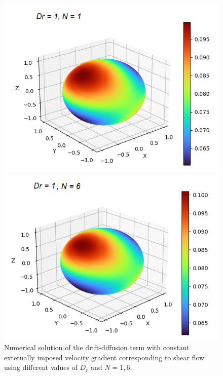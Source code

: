 \begin{frame}
\begin{figure}[H]
\begin{minipage}{0.4\textwidth}
			\includegraphics[scale=0.4]{Bilder_wx/wx=1_Dr=1_N=1}
		\end{minipage}
		\hfill 
		\begin{minipage}{0.4\textwidth}
			\includegraphics[scale=0.4]{Bilder_wx/wx=1_Dr=1_N=6}
		\end{minipage}
		\caption{ Numerical solution of the drift-diffusion term with constant externally imposed velocity gradient corresponding to shear flow using different values of $D_r$ and $N = 1,6$.}
	\end{figure}
\end{frame}
	


